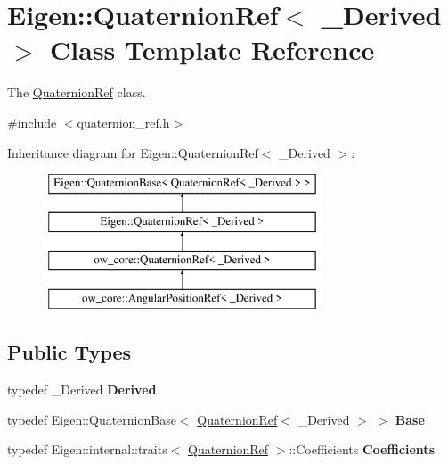 \hypertarget{classEigen_1_1QuaternionRef}{}\section{Eigen\+:\+:Quaternion\+Ref$<$ \+\_\+\+Derived $>$ Class Template Reference}
\label{classEigen_1_1QuaternionRef}


The \hyperlink{classEigen_1_1QuaternionRef}{Quaternion\+Ref} class.  




{\ttfamily \#include $<$quaternion\+\_\+ref.\+h$>$}

Inheritance diagram for Eigen\+:\+:Quaternion\+Ref$<$ \+\_\+\+Derived $>$\+:\begin{figure}[H]
\begin{center}
\leavevmode
\includegraphics[height=4.000000cm]{d7/d7b/classEigen_1_1QuaternionRef}
\end{center}
\end{figure}
\subsection*{Public Types}
\begin{DoxyCompactItemize}
\item 
typedef \+\_\+\+Derived {\bfseries Derived}\hypertarget{classEigen_1_1QuaternionRef_ae01d4bb6ac378f260ed60b076cadf7e8}{}\label{classEigen_1_1QuaternionRef_ae01d4bb6ac378f260ed60b076cadf7e8}

\item 
typedef Eigen\+::\+Quaternion\+Base$<$ \hyperlink{classEigen_1_1QuaternionRef}{Quaternion\+Ref}$<$ \+\_\+\+Derived $>$ $>$ {\bfseries Base}\hypertarget{classEigen_1_1QuaternionRef_a4eb09c1c2266a2a7d36fe6a8d9bd1f44}{}\label{classEigen_1_1QuaternionRef_a4eb09c1c2266a2a7d36fe6a8d9bd1f44}

\item 
typedef Eigen\+::internal\+::traits$<$ \hyperlink{classEigen_1_1QuaternionRef}{Quaternion\+Ref} $>$\+::Coefficients {\bfseries Coefficients}\hypertarget{classEigen_1_1QuaternionRef_a5f3aa5e5a4749058a47b2c491fc8adde}{}\label{classEigen_1_1QuaternionRef_a5f3aa5e5a4749058a47b2c491fc8adde}

\end{DoxyCompactItemize}
